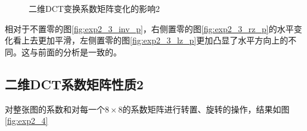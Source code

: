 \documentclass[10pt, a4paper]{article}
\begin{document}
\begin{figure}[htb!]
    \centering
    \quad
    \quad
    \caption{二维DCT变换系数矩阵变化的影响2}
    \label{fig:exp2_3.2}
\end{figure}

相对于不置零的图\ref{fig:exp2_3_inv_p}，右侧置零的图\ref{fig:exp2_3_rz_p}的水平变化看上去更加平滑，左侧置零的图\ref*{fig:exp2_3_lz_p}更加凸显了水平方向上的不同。这与前面的分析是一致的。

\subsection{二维DCT系数矩阵性质2}

对整张图的系数和对每一个$8\times8$的系数矩阵进行转置、旋转的操作，结果如图\ref*{fig:exp2_4}
\end{document}
